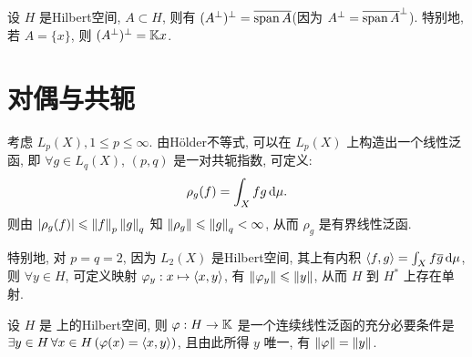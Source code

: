     \begin{Remark}
        设 $ H $ 是Hilbert空间, $ A\subset H $, 则有 $ (A^{\bot})^{\bot}=\overline{\operatorname{span} A} $(因为 $ A^{\bot}=\overline{\operatorname{span} A}^{\bot} $). 特别地, 若 $ A=\{ x \} $, 则 $ (A^{\bot})^{\bot}=\mathbb{K} x $.
    \end{Remark}

\section{对偶与共轭}

    考虑 $ L_{p}(X), 1\leqslant p\leqslant\infty $. 由H\"older不等式, 可以在 $ L_{p}(X) $ 上构造出一个线性泛函, 即 $ \forall g\in L_{q}(X) $, $ (p, q) $ 是一对共轭指数, 可定义:
    \[
        \rho_{g}(f)=\int_{X}fg\,\mathrm{d}\mu.
    \]
    则由 $ \left| \rho_{g}(f) \right| \leqslant\left\| f \right\|_{p}\left\| g \right\|_{q} $ 知 $ \left\| \rho_{g} \right\|\leqslant\left\| g \right\|_{q}<\infty $, 从而 $ \rho_{g} $ 是有界线性泛函. 

    特别地, 对 $ p=q=2 $, 因为 $ L_{2}(X) $ 是Hilbert空间, 其上有内积 $ \left\langle f, g \right\rangle=\int_{X}f\overline{g}\,\mathrm{d}\mu $, 则 $ \forall y\in H $, 可定义映射 $ \varphi_{y}:x\mapsto \left\langle x, y \right\rangle $, 有 $ \left\| \varphi_{y} \right\|\leqslant\left\| y \right\| $, 从而 $ H $ 到 $ H^{*} $ 上存在单射.

    \begin{Theorem}[Riesz表示定理]
         设 $ H $ 是 \K 上的Hilbert空间, 则 $ \varphi: H\to \mathbb{K} $ 是一个连续线性泛函的充分必要条件是 $ \exists y\in H\,\forall x\in H\,(\varphi(x)=\left\langle x, y \right\rangle) $, 且由此所得 $ y $ 唯一, 有 $ \left\| \varphi \right\|=\left\| y \right\| $.
    \end{Theorem}

